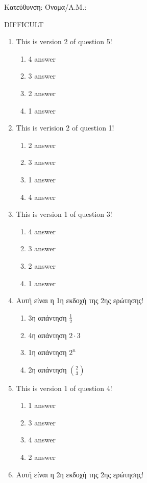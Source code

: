 \documentclass[a4paper, 11pt]{article}
\begin{document}
{\flushleft Κατεύθυνση: }
{\flushleft Όνομα/Α.Μ.: }
\vspace*{0.5cm}
\begin{center} {\Large  DIFFICULT } \end{center}
\begin{enumerate}
\item This is version 2 of question 5!
\begin{enumerate}[(1)]
    \item 4 answer
    \item 3 answer
    \item 2 answer
    \item 1 answer
\end{enumerate}
\item This is verision 2 of question 1!
\begin{enumerate}[(1)]
    \item 2 answer
    \item 3 answer
    \item 1 answer
    \item 4 answer
\end{enumerate}
\item This is version 1 of question 3!
\begin{enumerate}[(1)]
    \item 4 answer
    \item 3 answer
    \item 2 answer
    \item 1 answer
\end{enumerate}
\item Αυτή είναι η 1η εκδοχή της 2ης ερώτησης!
\begin{enumerate}[(1)]
    \item 3η απάντηση $\frac{1}{2}$
    \item 4η απάντηση $2\cdot 3$
    \item 1η απάντηση $2^n$
    \item 2η απάντηση $\binom{2}{3}$
\end{enumerate}
\item This is version 1 of question 4!
\begin{enumerate}[(1)]
    \item 1 answer
    \item 3 answer
    \item 4 answer
    \item 2 answer
\end{enumerate}
\item Αυτή είναι η 2η εκδοχή της 2ης ερώτησης!

\end{enumerate}
\end{document}
